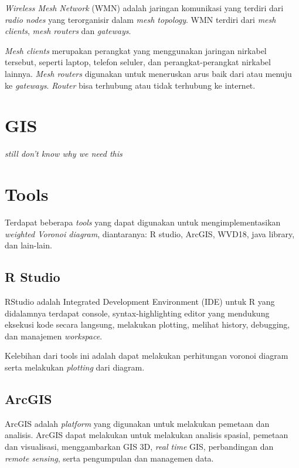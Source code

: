 \textit{Wireless Mesh Network} (WMN) adalah jaringan komunikasi yang terdiri dari \textit{radio nodes} yang terorganisir dalam \textit{mesh topology}. WMN terdiri dari \textit{mesh clients}, \textit{mesh routers} dan \textit{gateways}. 

\textit{Mesh clients} merupakan perangkat yang menggunakan jaringan nirkabel tersebut, seperti laptop, telefon seluler, dan perangkat-perangkat nirkabel lainnya. \textit{Mesh routers} digunakan untuk meneruskan arus baik dari atau menuju ke \textit{gateways}. \textit{Router} bisa terhubung atau tidak terhubung ke internet. 

\section{GIS}
\textit{still don't know why we need this}

\section{Tools}
Terdapat beberapa \textit{tools} yang dapat digunakan untuk mengimplementasikan \textit{weighted Voronoi diagram}, diantaranya: R studio, ArcGIS, WVD18, java library, dan lain-lain.

\subsection{R Studio}


RStudio adalah Integrated Development Environment (IDE) untuk R yang didalamnya terdapat console, syntax-highlighting editor yang mendukung eksekusi kode secara langsung, melakukan plotting, melihat history, debugging, dan manajemen \textit{workspace}.

Kelebihan dari tools ini adalah dapat melakukan perhitungan voronoi diagram serta melakukan \textit{plotting} dari diagram.

\subsection{ArcGIS}
ArcGIS adalah \textit{platform} yang digunakan untuk melakukan pemetaan dan analisis. ArcGIS dapat melakukan untuk melakukan analisis spasial, pemetaan dan visualisasi, menggambarkan GIS 3D, \textit{real time} GIS, perbandingan dan \textit{remote sensing}, serta pengumpulan dan managemen data. \cite{arcgis}

